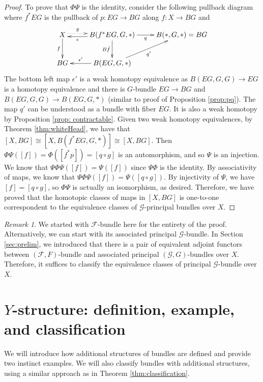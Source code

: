\documentclass[psamsfonts]{amsart}
\theoremstyle{definition}
\theoremstyle{remark}
\newtheorem{rem}[thm]{Remark}
\numberwithin{equation}{section}
\begin{document}
\begin{proof}
To prove that $\Phi\Psi$ is the identity, consider the following pullback diagram where $f^{*}EG$ is the pullback of $p: EG \rightarrow BG$ along $f: X \rightarrow BG$ and 
\[\xymatrix{
X \ar@{.>}[r]<.5ex>^-{g} \ar[d]_-{f} & B(f^{*}EG, G, *) \ar[l]<.5ex>^-{\epsilon}  \ar[d]_-{B\tilde{f}} \ar[r]_-{q} & B(*, G, *) = BG \\
BG & B(EG, G, *) \ar[l]_-{\epsilon'} \ar[ru]_-{q'} & \\
} \]
The bottom left map $\epsilon'$ is a weak homotopy equivalence as $B(EG, G, G) \to EG$ is a homotopy equivalence and there is $G$-bundle $EG \to BG$ and $B(EG, G, G) \to B(EG, G, *)$ (similar to proof of Proposition \ref{prop:pq}). The map $q'$ can be understood as a bundle with fiber $EG$. It is also a weak homotopy by Proposition \ref{prop: contractable}. Given two weak homotopy equivalences, by Theorem \ref{thm:whiteHead}, we have that $[X, BG] \cong [X, B(f^{*}EG, G, *)] \cong [X, BG]$. Then $\Phi\Psi([f]) = \Phi([f^{*}p]) = [q \circ g]$ is an automorphism, and so $\Psi$ is an injection. We know that $\Psi\Phi\Psi([f]) = \Psi([f])$ since $\Psi\Phi$ is the identity. By associativity of maps, we know that $\Psi\Phi\Psi([f]) = \Psi([q \circ g])$. By injectivity of $\Psi$, we have $[f] = [q \circ g]$, so $\Phi\Psi$ is actually an isomorphism, as desired.
Therefore, we have proved that the homotopic classes of maps in $[X, BG]$ is one-to-one correspondent to the equivalence classes of $\mathcal{G}$-principal bundles over $X$.
\end{proof}
\begin{rem}
	We started with $\mathcal{F}$-bundle here for the entirety of the proof. Alternatively, we can start with its associated principal $\mathcal{G}$-bundle. In Section \ref{sec:prelim}, we introduced that there is a pair of equivalent adjoint functors between $(\mathcal{F}, F)$-bundle and associated principal $(\mathcal{G}, G)$-bundles over $X$. Therefore, it suffices to classify the equivalence classes of principal $\mathcal{G}$-bundle over $X$.
\end{rem}






\section{$Y$-structure: definition, example, and classification}
We will introduce how additional structures of bundles are defined and provide two instinct examples. We will also classify bundles with additional structures, using a similar approach as in Theorem \ref{thm:classification}.
\end{document}
